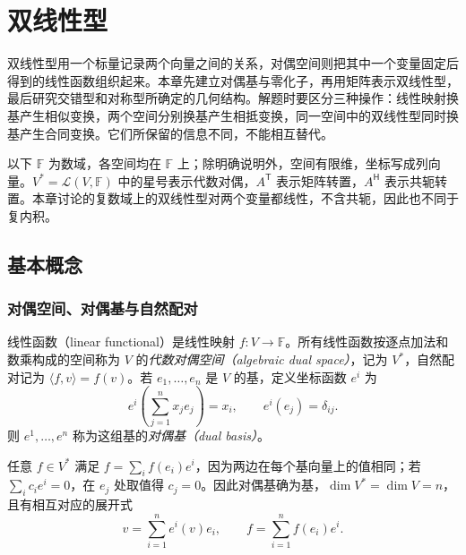 \setcounter{chapter}{9} %
\chapter{双线性型}
\label{chap:laex-bilinear}

双线性型用一个标量记录两个向量之间的关系，对偶空间则把其中一个变量固定后得到的线性函数组织起来。本章先建立对偶基与零化子，再用矩阵表示双线性型，最后研究交错型和对称型所确定的几何结构。解题时要区分三种操作：线性映射换基产生相似变换，两个空间分别换基产生相抵变换，同一空间中的双线性型同时换基产生合同变换。它们所保留的信息不同，不能相互替代。

以下 $\mathbb F$ 为数域，各空间均在 $\mathbb F$ 上；除明确说明外，空间有限维，坐标写成列向量。$V^*=\mathcal L(V,\mathbb F)$ 中的星号表示代数对偶，$A^{\mathsf T}$ 表示矩阵转置，$A^{\mathsf H}$ 表示共轭转置。本章讨论的复数域上的双线性型对两个变量都线性，不含共轭，因此也不同于复内积。

\section{基本概念}
\label{sec:laex-bilinear-basics}

\subsection{对偶空间、对偶基与自然配对}

\begin{definition}
\label{def:laex-dual}
线性函数（linear functional）是线性映射 $f:V\to\mathbb F$。所有线性函数按逐点加法和数乘构成的空间称为 $V$ 的\emph{代数对偶空间（algebraic dual space）}，记为 $V^*$，自然配对记为 $\langle f,v\rangle=f(v)$。若 $e_1,\ldots,e_n$ 是 $V$ 的基，定义坐标函数 $e^i$ 为
\[
 e^i\left(\sum_{j=1}^n x_je_j\right)=x_i,
 \qquad e^i(e_j)=\delta_{ij}.
\]
则 $e^1,\ldots,e^n$ 称为这组基的\emph{对偶基（dual basis）}。
\end{definition}

任意 $f\in V^*$ 满足 $f=\sum_i f(e_i)e^i$，因为两边在每个基向量上的值相同；若 $\sum_i c_ie^i=0$，在 $e_j$ 处取值得 $c_j=0$。因此对偶基确为基，$\dim V^*=\dim V=n$，且有相互对应的展开式
\begin{equation}
 v=\sum_{i=1}^n e^i(v)e_i,\qquad
 f=\sum_{i=1}^n f(e_i)e^i.
 \label{eq:laex-dual-expansion}
\end{equation}

